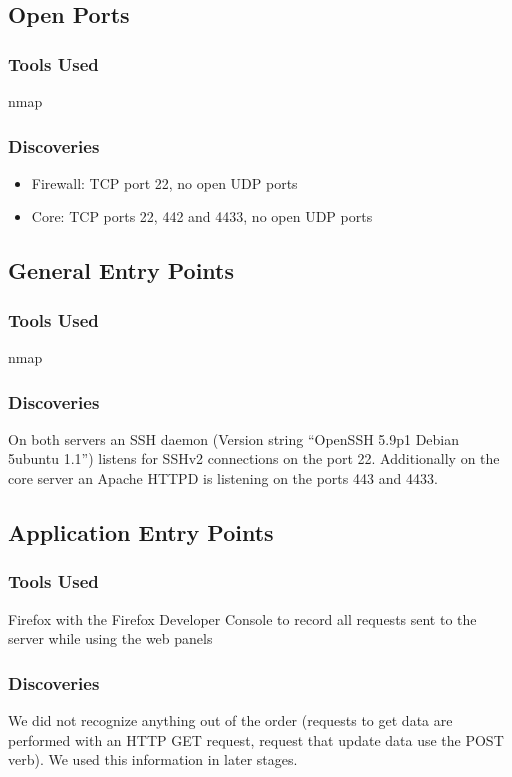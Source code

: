 \documentclass{article}
\begin{document}
\subsection{Open Ports}
\subsubsection*{Tools Used}
nmap

\subsubsection*{Discoveries}
\begin{itemize}
\item Firewall: TCP port 22, no open UDP ports
\item Core: TCP ports 22, 442 and 4433, no open UDP ports
\end{itemize}

\subsection{General Entry Points}
\subsubsection*{Tools Used}
nmap

\subsubsection*{Discoveries}
On both servers an SSH daemon (Version string ``OpenSSH 5.9p1 Debian 5ubuntu 1.1'') listens for SSHv2 connections on the port 22.\newline
Additionally on the core server an Apache HTTPD is listening on the ports 443 and 4433.

\subsection{Application Entry Points}
\subsubsection*{Tools Used}
Firefox with the Firefox Developer Console to record all requests sent to the server while using the web panels

\subsubsection*{Discoveries}
We did not recognize anything out of the order (requests to get data are performed with an HTTP GET request, request that update data use the POST verb). We used this information in later stages.
\end{document}
